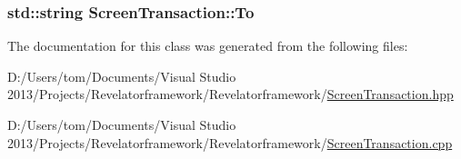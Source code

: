 \hypertarget{class_screen_transaction_acadac834d980c73ac6084fb52a7f882c}{
\subsubsection[{To}]{\setlength{\rightskip}{0pt plus 5cm}std\-::string Screen\-Transaction\-::\-To\hspace{0.3cm}{\ttfamily [protected]}}}\label{class_screen_transaction_acadac834d980c73ac6084fb52a7f882c}


The documentation for this class was generated from the following files\-:\begin{DoxyCompactItemize}
\item 
D\-:/\-Users/tom/\-Documents/\-Visual Studio 2013/\-Projects/\-Revelatorframework/\-Revelatorframework/\hyperlink{_screen_transaction_8hpp}{Screen\-Transaction.\-hpp}\item 
D\-:/\-Users/tom/\-Documents/\-Visual Studio 2013/\-Projects/\-Revelatorframework/\-Revelatorframework/\hyperlink{_screen_transaction_8cpp}{Screen\-Transaction.\-cpp}\end{DoxyCompactItemize}
